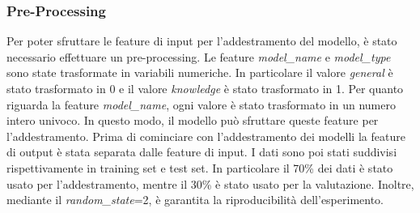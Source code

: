 \subsubsection{Pre-Processing}

Per poter sfruttare le feature di input per l'addestramento del modello, è stato necessario effettuare un pre-processing. Le feature \textit{model\_name} e \textit{model\_type} sono state trasformate in variabili numeriche. In particolare il valore \textit{general} è stato trasformato in 0 e il valore \textit{knowledge} è stato trasformato in 1.
Per quanto riguarda la feature \textit{model\_name}, ogni valore è stato trasformato in un numero intero univoco. In questo modo, il modello può sfruttare queste feature per l'addestramento.
Prima di cominciare con l'addestramento dei modelli la feature di output è stata separata dalle feature di input. I dati sono poi stati suddivisi rispettivamente in training set e test set. In particolare il 70\% dei dati è stato usato per l'addestramento, mentre il 30\% è stato usato per la valutazione. Inoltre, mediante il \textit{random\_state}=2, è garantita la riproducibilità dell'esperimento.

